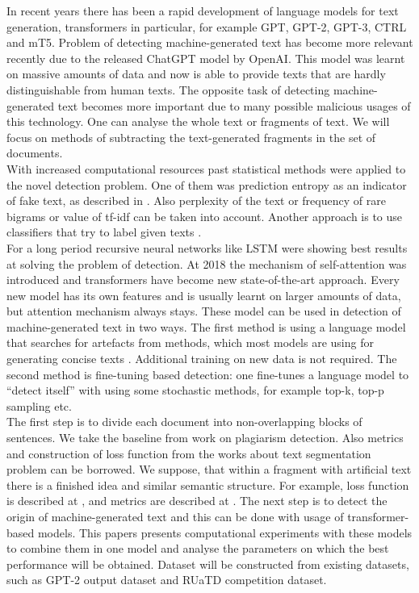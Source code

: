 \documentclass{article}
\begin{document}
In recent years there has been a rapid development of language models for text generation, transformers in particular, for example GPT\cite{gpt}, GPT-2\cite{gpt2}, GPT-3\cite{gpt3}, CTRL\cite{ctrl} and mT5\cite{mt5}. Problem of detecting machine-generated text has become more relevant recently due to the released ChatGPT model by OpenAI. This model was learnt on massive amounts of data and now is able to provide texts that are hardly distinguishable from human texts. The opposite task of detecting machine-generated text becomes more important due to many possible malicious usages of this technology. One can analyse the whole text or fragments of text.
We will focus on methods of subtracting the text-generated fragments in the set of documents.\\
With increased computational resources past statistical methods were applied to the novel detection problem. One of them was prediction entropy as an indicator of fake text, as described in \cite{relativeentropy}. Also perplexity\cite{perplexity} of the text or frequency of rare bigrams \cite{rare_bigrams} or value of tf-idf \cite{solaiman} can be taken into account. Another approach is to use classifiers that try to label given texts \cite{Kuznetsov}.\\
For a long period recursive neural networks like LSTM were showing best results at solving the problem of detection. At 2018 the mechanism of self-attention\cite{Vaswani} was introduced and transformers have become new state-of-the-art approach.  Every new model has its own features and is usually learnt on larger amounts of data, but attention mechanism always stays. These model can be used in detection of machine-generated text in two ways\cite{solaiman}. The first method is using a language model that searches for artefacts from  methods, which most models are using for generating concise texts \cite{gltr}. Additional training on new data is not required. The second method is fine-tuning based detection: one fine-tunes a language model to “detect itself” with using some stochastic methods, for example top-k, top-p sampling etc.\\
The first step is to divide each document into non-overlapping blocks of sentences. We take the baseline from work\cite{Kuznetsov} on plagiarism detection. Also metrics and construction of loss function from the works about text segmentation problem can be borrowed. We suppose, that within a fragment with artificial text there is a finished idea and similar semantic structure. For example, loss function is described at \cite{ts_loss}, and metrics are described at \cite{ts_metrics}. The next step is to detect the origin of machine-generated text and this can be done with usage of transformer-based models. This papers presents computational experiments with these models to combine them in one model and analyse the parameters on which the best performance will be obtained. Dataset will be constructed from existing datasets, such as GPT-2 output dataset\cite{gpt2-dataset} and RUaTD competition dataset\cite{ruatd-dataset}.  %
\end{document}
